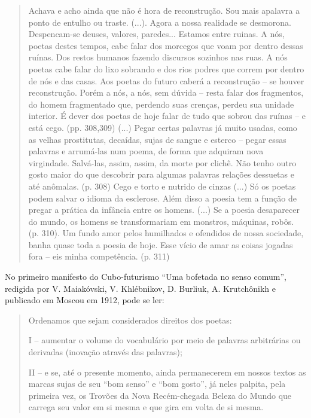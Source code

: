 \begin{quote}
Achava e acho ainda que não é hora de reconstrução. Sou mais apalavra a
ponto de entulho ou traste. (...). Agora a nossa realidade se desmorona.
Despencam-se deuses, valores, paredes... Estamos entre ruinas. A nós,
poetas destes tempos, cabe falar dos morcegos que voam por dentro dessas
ruínas. Dos restos humanos fazendo discursos sozinhos nas ruas. A nós
poetas cabe falar do lixo sobrando e dos rios podres que correm por
dentro de nós e das casas. Aos poetas do futuro caberá a reconstrução --
se houver reconstrução. Porém a nós, a nós, sem dúvida -- resta falar
dos fragmentos, do homem fragmentado que, perdendo suas crenças, perdeu
sua unidade interior. É dever dos poetas de hoje falar de tudo que
sobrou das ruínas -- e está cego. (pp. 308,309) (...) Pegar certas
palavras já muito usadas, como as velhas prostitutas, decaídas, sujas de
sangue e esterco -- pegar essas palavras e arrumá-las num poema, de
forma que adquiram nova virgindade. Salvá-las, assim, assim, da morte
por clichê. Não tenho outro gosto maior do que descobrir para algumas
palavras relações dessuetas e até anômalas. (p. 308) Cego e torto e
nutrido de cinzas (...) Só os poetas podem salvar o idioma da esclerose.
Além disso a poesia tem a função de pregar a prática da infância entre
os homens. (...) Se a poesia desaparecer do mundo, os homens se
transformariam em monstros, máquinas, robôs. (p. 310). Um fundo amor
pelos humilhados e ofendidos de nossa sociedade, banha quase toda a
poesia de hoje. Esse vício de amar as coisas jogadas fora -- eis minha
competência. (p. 311)
\end{quote}

No primeiro manifesto do Cubo-futurismo ``Uma bofetada no senso comum'',
redigida por V. Maiakóvski, V. Khlébnikov, D. Burliuk, A. Krutchônikh e
publicado em Moscou em 1912, pode se ler:

\begin{quote}
Ordenamos que sejam considerados direitos dos poetas:

I -- aumentar o volume do vocabulário por meio de palavras arbitrárias
ou derivadas (inovação através das palavras);

II -- e se, até o presente momento, ainda permanecerem em nossos textos
as marcas sujas de seu ``bom senso'' e ``bom gosto'', já neles palpita,
pela primeira vez, os Trovões da Nova Recém-chegada Beleza do Mundo que
carrega seu valor em si mesma e que gira em volta de si mesma.
\end{quote}

